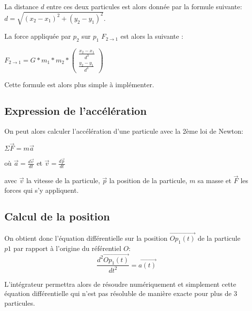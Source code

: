 La distance $d$ entre ces deux particules est alors donnée par la
formule suivante:
$d= \sqrt{(x_2-x_1)^2 + (y_2 - y_1)^2}$.

La force appliquée par $p_2$ sur $p_1$ $F_{2 \rightarrow 1}$ est alors la suivante :

\begin{center}
$F_{2 \rightarrow 1}=G*m_1*m_2*\begin{pmatrix}
\frac{x_2 -x_1}{d^3}\\
\frac{y_2 -y_1}{d^3}
\end{pmatrix}
$
\end{center}

\vspace{2mm}
Cette formule est alors plus simple à implémenter.

\vspace{3mm}
\subsection{Expression de l'accélération}
\vspace{2mm}

On peut alors calculer l'accélération d'une particule avec la 2ème loi de Newton:
\begin{center}
    


$\Sigma \vec{F} = m \vec{a}$

\vspace{2mm}
où 
$\vec{a}=\frac{d\vec{v}}{dt}$ et $ \vec{v}= \frac{d\vec{p}}{dt}$


\end{center}

avec $\vec{v}$ la vitesse de la particule, $\vec{p}$ la position de la particule, $m$ sa masse et $\vec{F}$ les forces qui s'y appliquent.

\subsection{Calcul de la position}

On obtient donc l'équation différentielle sur la position $\vec{Op_1(t)}$ de la particule $p1$ par rapport à l'origine du référentiel $O$:
\begin{equation}
\frac{d^2 \vec{Op_1(t)}}{dt^2} = \vec{a(t)}
\end{equation}

L'intégrateur permettra alors de résoudre numériquement et simplement cette équation différentielle qui n'est pas résoluble de manière exacte pour plus de $3$ particules.

